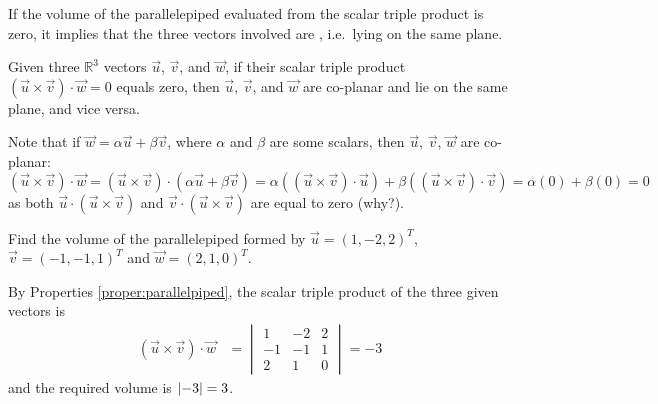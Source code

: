 If the volume of the parallelepiped evaluated from the scalar triple product is zero, it implies that the three vectors involved are , i.e.\ lying on the same plane.
\begin{proper}
Given three $\mathbb{R}^3$ vectors $\vec{u}$, $\vec{v}$, and $\vec{w}$, if their scalar triple product $(\vec{u} \times \vec{v}) \cdot \vec{w} = 0$ equals zero, then $\vec{u}$, $\vec{v}$, and $\vec{w}$ are co-planar and lie on the same plane, and vice versa.
\end{proper}
Note that if $\vec{w} = \alpha \vec{u} + \beta \vec{v}$, where $\alpha$ and $\beta$ are some scalars, then $\vec{u}$, $\vec{v}$, $\vec{w}$ are co-planar: $(\vec{u} \times \vec{v}) \cdot \vec{w} = (\vec{u} \times \vec{v}) \cdot (\alpha \vec{u} + \beta \vec{v}) = \alpha ((\vec{u} \times \vec{v}) \cdot \vec{u}) + \beta ((\vec{u} \times \vec{v}) \cdot \vec{v}) = \alpha(0) + \beta(0) = 0$ as both $\vec{u} \cdot (\vec{u} \times \vec{v})$ and $\vec{v} \cdot (\vec{u} \times \vec{v})$ are equal to zero (why?).

\begin{exmp}
Find the volume of the parallelepiped formed by $\vec{u} = (1,-2,2)^T$, $\vec{v} =(-1,-1,1)^T$ and $\vec{w}=(2,1,0)^T$.
\end{exmp}
\begin{solution}
By Properties \ref{proper:parallelpiped}, the scalar triple product of the three given vectors is
\begin{align*}
(\vec{u} \times \vec{v}) \cdot \vec{w} &=
\begin{vmatrix}
1 & -2 & 2 \\
-1 & -1 & 1 \\
2 & 1 & 0
\end{vmatrix}
= -3
\end{align*}
and the required volume is $\abs{-3} = 3$.
\end{solution}

